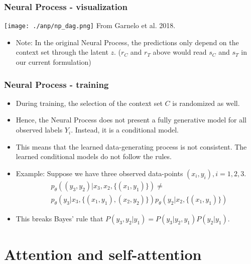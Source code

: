 \documentclass[t]{beamer}
\begin{document}
 \begin{frame}
   \frametitle{Neural Process - visualization}
   \texttt{[image: ./anp/np\_dag.png]}
   \centering From Garnelo et al. 2018.
   \begin{itemize}
   \item Note: In the original Neural Process, the predictions only depend on the
     context set through the latent $z$. ($r_C$ and $r_T$ above would read $s_C$ and $s_T$ in our current formulation)
   \end{itemize}
 \end{frame}

 
 \begin{frame}
   \frametitle{Neural Process - training}
   \begin{itemize}
   \item During training, the selection of the context set $C$ is randomized as well.
   \item Hence, the Neural Process does not present a fully generative model for all observed labels $Y_i$.
     Instead, it is a conditional model.
   \item This means that the learned data-generating process is not consistent. The learned conditional models do not follow the rules.
    \item Example: Suppose we have three observed data-points $(x_i, y_i), i = 1,2,3$.
     \[
       \begin{split}
         &p_\theta((y_3, y_2) | x_3, x_2, \{(x_1, y_1)\}) \ne \\
         &p_\theta(y_3 | x_3, \{(x_1, y_1), (x_2, y_2)\}) p_\theta(y_2 | x_2, \{(x_1, y_1)\})
     \end{split}
   \]
   \item This breaks Bayes' rule that $P(y_3, y_2 | y_1) = P(y_3 | y_2, y_1) P(y_2 | y_1)$.
   \end{itemize}
 \end{frame}

\section{Attention and self-attention}
\end{document}
